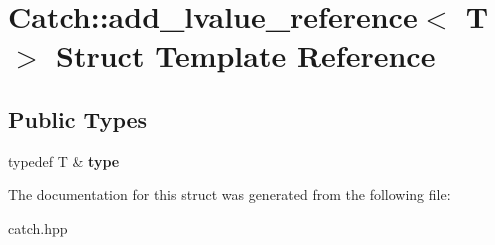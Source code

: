 \hypertarget{structCatch_1_1add__lvalue__reference}{}\section{Catch\+:\+:add\+\_\+lvalue\+\_\+reference$<$ T $>$ Struct Template Reference}
\label{structCatch_1_1add__lvalue__reference}
\subsection*{Public Types}
\begin{DoxyCompactItemize}
\item 
\mbox{\label{structCatch_1_1add__lvalue__reference_aeecfbd85be922b674cf8ddba5bb3eb07}} 
typedef T \& {\bfseries type}
\end{DoxyCompactItemize}


The documentation for this struct was generated from the following file\+:\begin{DoxyCompactItemize}
\item 
catch.\+hpp\end{DoxyCompactItemize}
